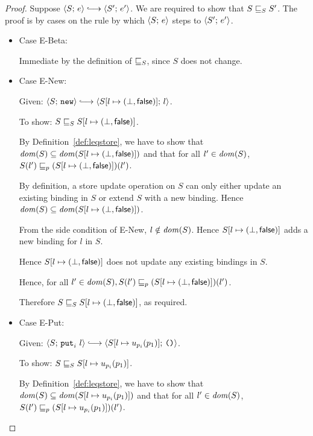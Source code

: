 \begin{proof}
  Suppose $\config{S}{e} \parstepsto \config{S'}{e'}$.  We are
  required to show that $S \sqsubseteq_S S'$.  The proof is by cases on
  the rule by which $\langle S;\, e \rangle$ steps to $\langle S';\, e' \rangle$.

  \begin{itemize}
    \item Case {\sc E-Beta}:

      Immediate by the definition of $ \sqsubseteq_S $, since $S$ does
      not change.

    \item Case {\sc E-New}:

      Given: $\config{S}{\NEW} \parstepsto
      \config{\extS{S}{l}{\bot}{\frozenfalse}}{l}$.

      To show: $S \sqsubseteq_S S[l \mapsto (\bot, \textsf{false})]$.

      By Definition~\ref{def:leqstore}, we have to show that $\mathit{dom}(S)
      \subseteq \mathit{dom}(S[l \mapsto (\bot, \textsf{false})])$ and that for
      all $l' \in \mathit{dom}(S)$, $S(l') \sqsubseteq_p
      (S[l \mapsto (\bot, \textsf{false})])(l')$.

      By definition, a store update operation on $S$ can only either
      update an existing binding in $S$ or extend $S$ with a new
      binding.  Hence $\mathit{dom}(S) \subseteq
      \mathit{dom}(S[l \mapsto (\bot, \textsf{false})])$.

      From the side condition of {\sc E-New}, $l \notin \mathit{dom}(S)$.
      Hence $S[l \mapsto (\bot, \textsf{false})]$ adds a new binding for
      $l$ in $S$.

      Hence $S[l \mapsto (\bot, \textsf{false})]$ does not update any
      existing bindings in $S$.

      Hence, for all $l' \in \mathit{dom}(S), S(l') \sqsubseteq_p
      (S[l \mapsto (\bot, \textsf{false})])(l')$.

      Therefore $S \sqsubseteq_S S[l \mapsto (\bot, \textsf{false})]$, as
      required.

    \item Case {\sc E-Put}:

      Given: $\config{S}{\putiexp{l}} \parstepsto
      \config{\extSRaw{S}{l}{u_{p_i}(p_1)}}{\unit}$.

      To show: $S \sqsubseteq_S S[l \mapsto u_{p_i}(p_1)]$.

      By Definition~\ref{def:leqstore}, we have to show that $\mathit{dom}(S)
      \subseteq \mathit{dom}(S[l \mapsto u_{p_i}(p_1)])$ and that for all
      $l' \in \mathit{dom}(S)$, $S(l') \sqsubseteq_p
      (S[l \mapsto u_{p_i}(p_1)])(l')$.


\end{itemize}
\end{proof}
